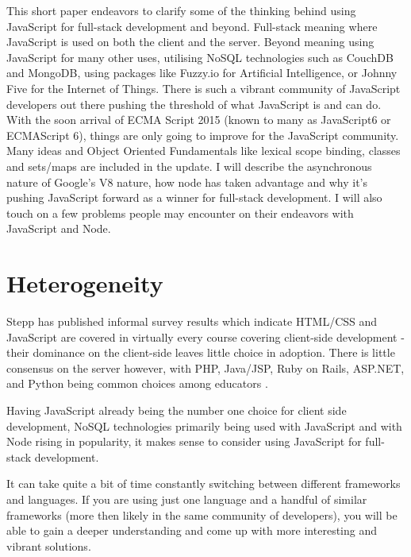\documentclass[12pt]{article} %
\begin{document}
This short paper endeavors to clarify some of the thinking behind using JavaScript for full-stack development and beyond. Full-stack meaning where JavaScript is used on both the client and the server. Beyond meaning using JavaScript for many other uses, utilising NoSQL technologies such as CouchDB and MongoDB, using packages like Fuzzy.io for Artificial Intelligence, or Johnny Five for the Internet of Things. There is such a vibrant community of JavaScript developers out there pushing the threshold of what JavaScript is and can do. 
With the soon arrival of ECMA Script 2015 (known to many as JavaScript6 or ECMAScript 6), things are only going to improve for the JavaScript community. Many ideas and Object Oriented Fundamentals like lexical scope binding, classes and sets/maps are included in the update.
I will describe the asynchronous nature of Google's V8 nature, how node has taken advantage and why it's pushing JavaScript forward as a winner for full-stack development. I will also touch on a few problems people may encounter on their endeavors with JavaScript and Node.


\section{Heterogeneity} %
Stepp \cite{9} has published informal survey results which indicate HTML/CSS and JavaScript are covered in virtually every course covering client-side development - their dominance on the client-side leaves little choice in adoption. There is little consensus on the server however, with PHP, Java/JSP, Ruby on Rails, ASP.NET, and Python being common choices among educators \cite{1}.

Having JavaScript already being the number one choice for client side development, NoSQL technologies primarily being used with JavaScript and with Node rising in popularity, it makes sense to consider using JavaScript for full-stack development.

It can take quite a bit of time constantly switching between different frameworks and languages. If you are using just one language and a handful of similar frameworks (more then likely in the same community of developers), you will be able to gain a deeper understanding and come up with more interesting and vibrant solutions.
\end{document}
